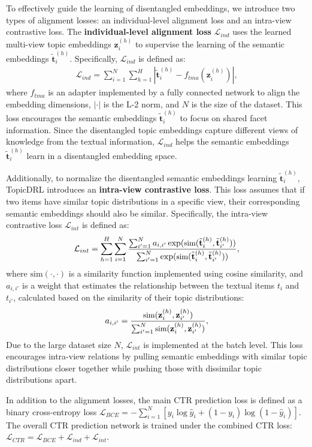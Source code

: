 To effectively guide the learning of disentangled embeddings, we introduce two types of alignment losses: an individual-level alignment loss and an intra-view contrastive loss. The \textbf{individual-level alignment loss} $\mathcal{L}_{ind}$ uses the learned multi-view topic embeddings $\mathbf{z}_i^{(h)}$ to supervise the learning of the semantic embeddings $\tilde{\mathbf{t}}_i^{(h)}$. Specifically, $\mathcal{L}_{ind}$ is defined as:
\begin{align}
    \mathcal{L}_{ind} = \sum_{i=1}^N \sum_{h=1}^H |\tilde{\mathbf{t}}_i^{(h)} - f_{tma}(\mathbf{z}_i^{(h)})| ,
\end{align}
where $f_{tma}$ is an adapter implemented by a fully connected network to align the embedding dimensions, $|\cdot|$ is the L-2 norm, and $N$ is the size of the dataset. This loss encourages the semantic embeddings $\tilde{\mathbf{t}}_i^{(h)}$ to focus on shared facet information. Since the disentangled topic embeddings capture different views of knowledge from the textual information, $\mathcal{L}_{ind}$ helps the semantic embeddings $\tilde{\mathbf{t}}_i^{(h)}$ learn in a disentangled embedding space.


Additionally, to normalize the disentangled semantic embeddings learning $\tilde{\mathbf{t}}_i^{(h)}$, TopicDRL introduces an \textbf{intra-view contrastive loss}. This loss assumes that if two items have similar topic distributions in a specific view, their corresponding semantic embeddings should also be similar. Specifically, the intra-view contrastive loss $\mathcal{L}_{int}$ is defined as:
\begin{align}
\small
    \mathcal{L}_{int} = \sum_{h=1}^H \sum_{i=1}^N \frac{\sum_{i'=1}^N a_{i,i'} \exp(\text{sim}(\tilde{\mathbf{t}}_i^{(h)}, \tilde{\mathbf{t}}_{i'}^{(h)}))}{\sum_{i'=1}^N \exp(\text{sim}(\tilde{\mathbf{t}}_i^{(h)}, \tilde{\mathbf{t}}_{i'}^{(h)}))} ,
\end{align}
where $\text{sim}(\cdot, \cdot)$ is a similarity function implemented using cosine similarity, and $a_{i,i'}$ is a weight that estimates the relationship between the textual items $t_i$ and $t_{i'}$, calculated based on the similarity of their topic distributions:
\begin{align}
\small
    a_{i,i'} = \frac{\text{sim}(\mathbf{z}_i^{(h)}, \mathbf{z}_{i'}^{(h)})}{\sum_{i'=1}^N \text{sim}(\mathbf{z}_i^{(h)}, \mathbf{z}_{i'}^{(h)})} ,
\end{align}
Due to the large dataset size $N$, $\mathcal{L}_{int}$ is implemented at the batch level. This loss encourages intra-view relations by pulling semantic embeddings with similar topic distributions closer together while pushing those with dissimilar topic distributions apart.

In addition to the alignment losses, the main CTR prediction loss is defined as a binary cross-entropy loss $\mathcal{L}_{BCE} = - \sum_{i=1}^N [y_i \log \hat{y}_i + (1-y_i)\log (1-\hat{y}_i)]$.
The overall CTR prediction network is trained under the combined CTR loss:
$
\mathcal{L}_{CTR} = \mathcal{L}_{BCE} + \mathcal{L}_{ind} + \mathcal{L}_{int}.
$